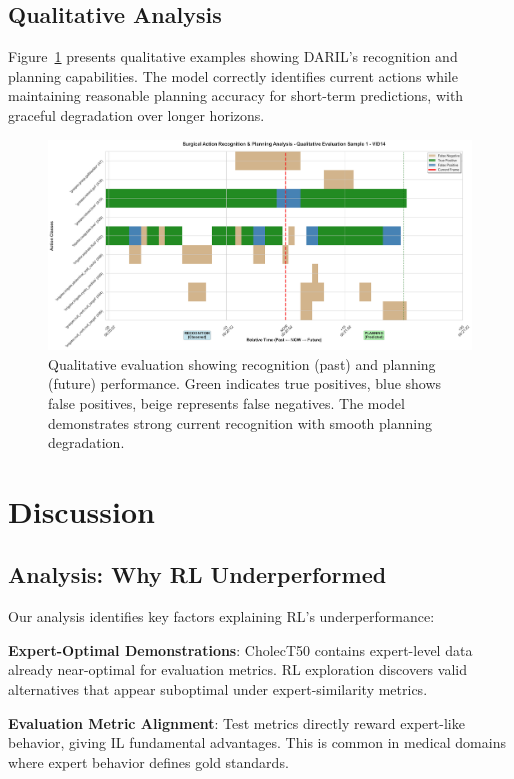 \documentclass[runningheads]{llncs}
\begin{document}
\subsection{Qualitative Analysis}

Figure~\ref{fig:qualitative} presents qualitative examples showing DARIL's recognition and planning capabilities. The model correctly identifies current actions while maintaining reasonable planning accuracy for short-term predictions, with graceful degradation over longer horizons.

\begin{figure}[h]
\centering
\includegraphics[width=\textwidth]{VID14_preds_sample_1.png}
\caption{Qualitative evaluation showing recognition (past) and planning (future) performance. Green indicates true positives, blue shows false positives, beige represents false negatives. The model demonstrates strong current recognition with smooth planning degradation.}
\label{fig:qualitative}
\end{figure}

\section{Discussion}

\subsection{Analysis: Why RL Underperformed}

Our analysis identifies key factors explaining RL's underperformance:

\textbf{Expert-Optimal Demonstrations}: CholecT50 contains expert-level data already near-optimal for evaluation metrics. RL exploration discovers valid alternatives that appear suboptimal under expert-similarity metrics.

\textbf{Evaluation Metric Alignment}: Test metrics directly reward expert-like behavior, giving IL fundamental advantages. This is common in medical domains where expert behavior defines gold standards.
\end{document}
